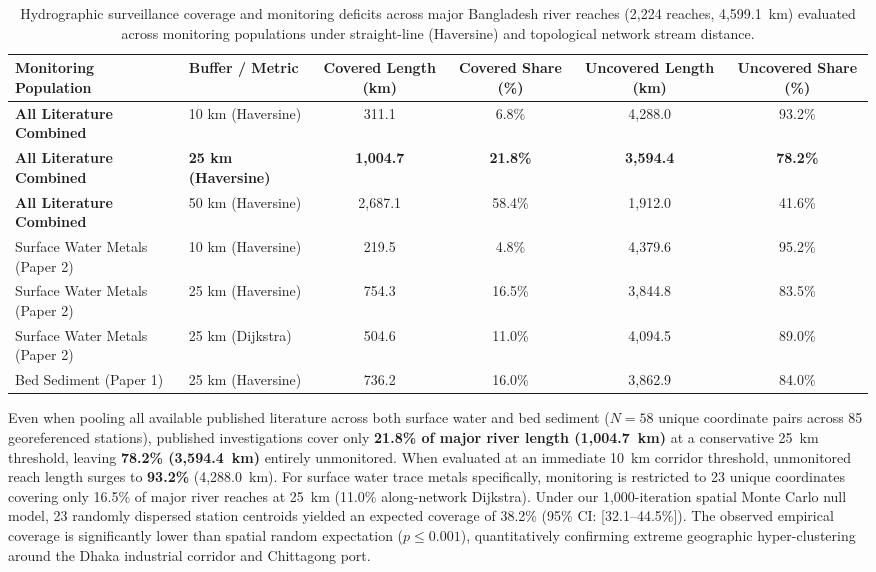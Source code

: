 \documentclass[authoryear,preprint,12pt]{elsarticle}
\begin{document}
\begin{table}[htbp]
\centering
\small
\caption{Hydrographic surveillance coverage and monitoring deficits across major Bangladesh river reaches (2,224 reaches, 4,599.1~km) evaluated across monitoring populations under straight-line (Haversine) and topological network stream distance.}
\label{tab:coverage}
\begin{tabular}{llcccc}
\toprule
Monitoring Population & Buffer / Metric & Covered Length (km) & Covered Share (\%) & Uncovered Length (km) & Uncovered Share (\%) \\
\midrule
\textbf{All Literature Combined} & 10 km (Haversine) & 311.1 & 6.8\% & 4,288.0 & 93.2\% \\
\textbf{All Literature Combined} & \textbf{25 km (Haversine)} & \textbf{1,004.7} & \textbf{21.8\%} & \textbf{3,594.4} & \textbf{78.2\%} \\
\textbf{All Literature Combined} & 50 km (Haversine) & 2,687.1 & 58.4\% & 1,912.0 & 41.6\% \\
\midrule
Surface Water Metals (Paper 2) & 10 km (Haversine) & 219.5 & 4.8\% & 4,379.6 & 95.2\% \\
Surface Water Metals (Paper 2) & 25 km (Haversine) & 754.3 & 16.5\% & 3,844.8 & 83.5\% \\
Surface Water Metals (Paper 2) & 25 km (Dijkstra) & 504.6 & 11.0\% & 4,094.5 & 89.0\% \\
\midrule
Bed Sediment (Paper 1) & 25 km (Haversine) & 736.2 & 16.0\% & 3,862.9 & 84.0\% \\
\bottomrule
\end{tabular}
\end{table}

Even when pooling all available published literature across both surface water and bed sediment ($N=58$ unique coordinate pairs across 85 georeferenced stations), published investigations cover only \textbf{21.8\% of major river length (1,004.7~km)} at a conservative 25~km threshold, leaving \textbf{78.2\% (3,594.4~km)} entirely unmonitored. When evaluated at an immediate 10~km corridor threshold, unmonitored reach length surges to \textbf{93.2\%} (4,288.0~km). For surface water trace metals specifically, monitoring is restricted to 23 unique coordinates covering only 16.5\% of major river reaches at 25~km (11.0\% along-network Dijkstra). Under our 1,000-iteration spatial Monte Carlo null model, 23 randomly dispersed station centroids yielded an expected coverage of 38.2\% (95\% CI: [32.1--44.5\%]). The observed empirical coverage is significantly lower than spatial random expectation ($p \le 0.001$), quantitatively confirming extreme geographic hyper-clustering around the Dhaka industrial corridor and Chittagong port.
\end{document}
